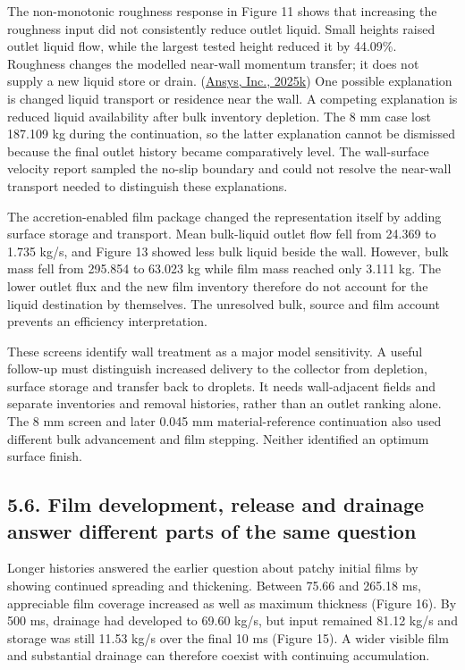 \documentclass[
  12pt,
  a4paper,
]{article}
\begin{document}
The non-monotonic roughness response in Figure 11 shows that increasing
the roughness input did not consistently reduce outlet liquid. Small
heights raised outlet liquid flow, while the largest tested height
reduced it by 44.09\%. Roughness changes the modelled near-wall momentum
transfer; it does not supply a new liquid store or drain.
(\href{https://ansyshelp.ansys.com/public/Views/Secured/corp/v252/en/flu_th/x1-5720008.164.html}{Ansys,
Inc., 2025k}) One possible explanation is changed liquid transport or
residence near the wall. A competing explanation is reduced liquid
availability after bulk inventory depletion. The 8 mm case lost 187.109
kg during the continuation, so the latter explanation cannot be
dismissed because the final outlet history became comparatively level.
The wall-surface velocity report sampled the no-slip boundary and could
not resolve the near-wall transport needed to distinguish these
explanations.

The accretion-enabled film package changed the representation itself by
adding surface storage and transport. Mean bulk-liquid outlet flow fell
from 24.369 to 1.735 kg/s, and Figure 13 showed less bulk liquid beside
the wall. However, bulk mass fell from 295.854 to 63.023 kg while film
mass reached only 3.111 kg. The lower outlet flux and the new film
inventory therefore do not account for the liquid destination by
themselves. The unresolved bulk, source and film account prevents an
efficiency interpretation.

These screens identify wall treatment as a major model sensitivity. A
useful follow-up must distinguish increased delivery to the collector
from depletion, surface storage and transfer back to droplets. It needs
wall-adjacent fields and separate inventories and removal histories,
rather than an outlet ranking alone. The 8 mm screen and later 0.045 mm
material-reference continuation also used different bulk advancement and
film stepping. Neither identified an optimum surface finish.

\subsection{5.6. Film development, release and drainage answer different
parts of the same
question}\label{film-development-release-and-drainage-answer-different-parts-of-the-same-question}

Longer histories answered the earlier question about patchy initial
films by showing continued spreading and thickening. Between 75.66 and
265.18 ms, appreciable film coverage increased as well as maximum
thickness (Figure 16). By 500 ms, drainage had developed to 69.60 kg/s,
but input remained 81.12 kg/s and storage was still 11.53 kg/s over the
final 10 ms (Figure 15). A wider visible film and substantial drainage
can therefore coexist with continuing accumulation.
\end{document}
